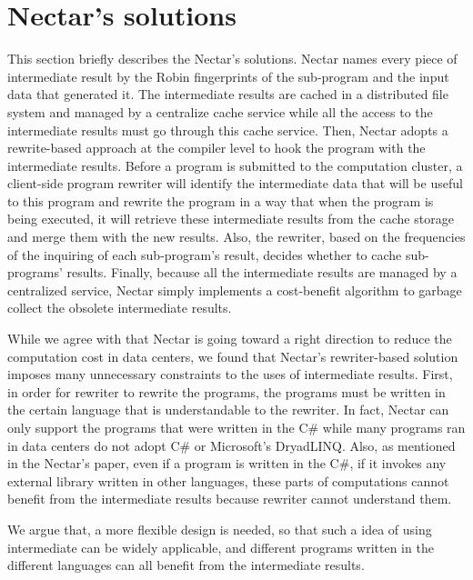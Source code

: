 \section{Nectar's solutions}

This section briefly describes the Nectar's solutions. Nectar names every piece of intermediate
result by the Robin fingerprints of the sub-program and the input
data that generated it.  The intermediate results are cached
in a distributed file system and managed by a centralize cache
service while all the access to the intermediate results must go through
this cache service.  Then, Nectar adopts a rewrite-based approach at
the compiler level to hook the program with the intermediate results.
Before a program is submitted to the computation cluster, a
client-side program rewriter will identify the intermediate data that
will be useful to this program and rewrite the program in a way that when the program is being executed, it will
retrieve these intermediate results from the cache storage and merge
them with the new results. Also, the rewriter, based on the frequencies of
the inquiring of each sub-program's result, decides whether to cache
sub-programs' results.  Finally, because all the intermediate results
are managed by a centralized service, Nectar simply implements a
cost-benefit algorithm to garbage collect the obsolete intermediate
results.

While we agree with that Nectar is going toward a right direction to reduce the
computation cost in data centers, we found that Nectar's rewriter-based
solution imposes many unnecessary constraints to the uses of intermediate results.
First, in order for rewriter to rewrite the programs, the
programs must be written in the certain language that is
understandable to the rewriter. In fact, Nectar can only support the programs that were
written in the C\# while many programs ran in data centers do not
adopt C\# or Microsoft's DryadLINQ. Also, as mentioned in the Nectar's paper,
even if a program is written in the C\#, if it invokes any external library written in
other languages, these parts of computations cannot benefit
from the intermediate results because rewriter cannot understand them. 

We argue that, a more flexible design is needed, so that such a idea
of using intermediate can be widely applicable, and different programs written in the different
languages can all benefit from the intermediate results. 

